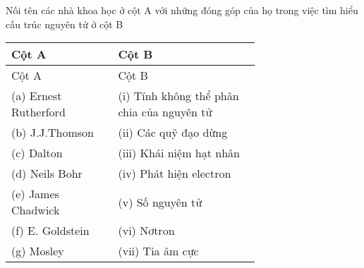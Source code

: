 \begin{bt}
	Nối tên các nhà khoa học ở cột A với những đóng góp của họ trong việc tìm hiểu cấu trúc nguyên tử ở cột B
	\par\noindent
		\begin{longtable}{|p{0.3\linewidth}|p{0.4\linewidth}|}
			\hline\rowcolor{\mycolor!10}
			Cột A & Cột B \\
			\hline
			\endfirsthead
			\hline\rowcolor{\mycolor!10}
			Cột A & Cột B \\
			\hline
			\endhead
			\hline
			\endfoot
			\hline
			\endlastfoot
			(a) Ernest Rutherford & (i) Tính không thể phân chia của nguyên tử\\
			(b) J.J.Thomson &(ii) Các quỹ đạo dừng\\
			(c) Dalton &(iii) Khái niệm hạt nhân\\
			(d) Neils Bohr &(iv) Phát hiện electron\\
			(e) James Chadwick &(v) Số nguyên tử\\
			(f) E. Goldstein &(vi) Nơtron\\
			(g) Mosley &(vii) Tia âm cực\\
			\hline
		\end{longtable}
\end{bt}
